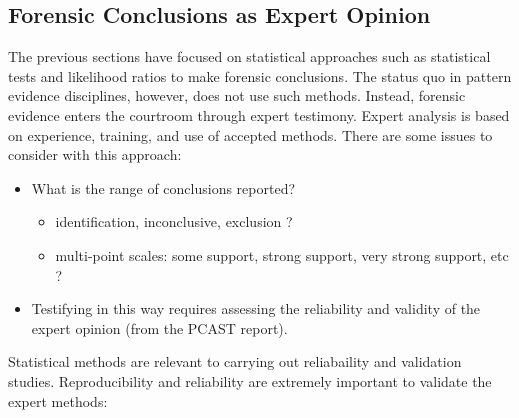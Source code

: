 \documentclass[]{book}
\providecommand{\tightlist}{%
  \setlength{\itemsep}{0pt}\setlength{\parskip}{0pt}}
\theoremstyle{definition}
\theoremstyle{definition}
\theoremstyle{remark}
\begin{document}
\subsection{Forensic Conclusions as Expert
Opinion}\label{forensic-conclusions-as-expert-opinion}

The previous sections have focused on statistical approaches such as
statistical tests and likelihood ratios to make forensic conclusions.
The status quo in pattern evidence disciplines, however, does not use
such methods. Instead, forensic evidence enters the courtroom through
expert testimony. Expert analysis is based on experience, training, and
use of accepted methods. There are some issues to consider with this
approach:

\begin{itemize}
\tightlist
\item
  What is the range of conclusions reported?

  \begin{itemize}
  \tightlist
  \item
    identification, inconclusive, exclusion ?
  \item
    multi-point scales: some support, strong support, very strong
    support, etc ?
  \end{itemize}
\item
  Testifying in this way requires assessing the reliability and validity
  of the expert opinion (from the PCAST report).
\end{itemize}

Statistical methods are relevant to carrying out reliabaility and
validation studies. Reproducibility and reliability are extremely
important to validate the expert methods:
\end{document}
